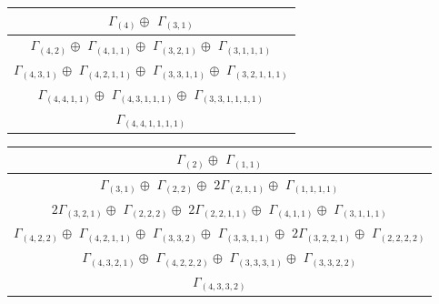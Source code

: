 \documentclass[main.tex]{subfiles}
\begin{document}
\begin{minipage}{.4\textwidth}
\centering
\begin{tabular}{c}
$\Gamma_{(
4
)} \oplus$
$\Gamma_{(
3 , 
1
)}$
\\ \hline
$\Gamma_{(
4 , 
2
)} \oplus$
$\Gamma_{(
4 , 
1 , 
1
)} \oplus$
$\Gamma_{(
3 , 
2 , 
1
)} \oplus$
$\Gamma_{(
3 , 
1 , 
1 , 
1
)}$
\\ \hline
$\Gamma_{(
4 , 
3 , 
1
)} \oplus$
$\Gamma_{(
4 , 
2 , 
1 , 
1
)} \oplus$
$\Gamma_{(
3 , 
3 , 
1 , 
1
)} \oplus$
$\Gamma_{(
3 , 
2 , 
1 , 
1 , 
1
)}$
\\ \hline
$\Gamma_{(
4 , 
4 , 
1 , 
1
)} \oplus$
$\Gamma_{(
4 , 
3 , 
1 , 
1 , 
1
)} \oplus$
$\Gamma_{(
3 , 
3 , 
1 , 
1 , 
1 , 
1
)}$
\\ \hline
$\Gamma_{(
4 , 
4 , 
1 , 
1 , 
1 , 
1
)}$
\\
\end{tabular}\end{minipage}
\begin{minipage}{.6\textwidth}
\centering
\begin{tabular}{c}
$\Gamma_{(
2
)} \oplus$
$\Gamma_{(
1 , 
1
)}$
\\ \hline
$\Gamma_{(
3 , 
1
)} \oplus$
$\Gamma_{(
2 , 
2
)} \oplus$
$ 2 \Gamma_{(
2 , 
1 , 
1
)} \oplus$
$\Gamma_{(
1 , 
1 , 
1 , 
1
)}$
\\ \hline
$ 2 \Gamma_{(
3 , 
2 , 
1
)} \oplus$
$\Gamma_{(
2 , 
2 , 
2
)} \oplus$
$ 2 \Gamma_{(
2 , 
2 , 
1 , 
1
)} \oplus$
$\Gamma_{(
4 , 
1 , 
1
)} \oplus$
$\Gamma_{(
3 , 
1 , 
1 , 
1
)}$
\\ \hline
$\Gamma_{(
4 , 
2 , 
2
)} \oplus$
$\Gamma_{(
4 , 
2 , 
1 , 
1
)} \oplus$
$\Gamma_{(
3 , 
3 , 
2
)} \oplus$
$\Gamma_{(
3 , 
3 , 
1 , 
1
)} \oplus$
$ 2 \Gamma_{(
3 , 
2 , 
2 , 
1
)} \oplus$
$\Gamma_{(
2 , 
2 , 
2 , 
2
)}$
\\ \hline
$\Gamma_{(
4 , 
3 , 
2 , 
1
)} \oplus$
$\Gamma_{(
4 , 
2 , 
2 , 
2
)} \oplus$
$\Gamma_{(
3 , 
3 , 
3 , 
1
)} \oplus$
$\Gamma_{(
3 , 
3 , 
2 , 
2
)}$
\\ \hline
$\Gamma_{(
4 , 
3 , 
3 , 
2
)}$
\\
\end{tabular}\end{minipage}
\bigskip
\end{document}
